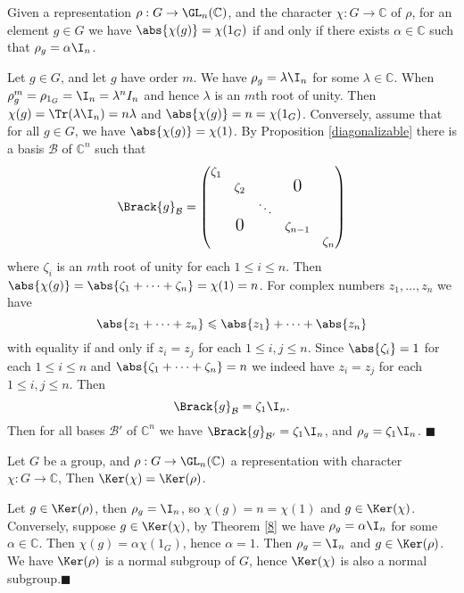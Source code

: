 \documentclass[../Project.tex]{subfiles}
\begin{document}
\begin{theo}[{\cite[13.11(1)]{2}}]
	Given a representation $\rho : G \to \GL_n(\mathbb{C})$, and the character $\chi : G \to \mathbb{C}$ of $\rho$, for an element $g \in G$ we have $\abs{\chi(g)} = \chi(1_G)$ if and only if there exists $\alpha \in \mathbb{C}$ such that $\rho_g = \alpha \I_n$.
	\label{8}
\end{theo}
\begin{proo*}[{\cite[13.11(1)]{2}}]
	Let $g \in G$, and let $g$ have order $m$. We have  $\rho_g = \lambda\I_n$ for some $\lambda \in \mathbb{C}$. When $\rho_g^m = \rho_{1_G} = \I_n = \lambda^nI_n$ and hence $\lambda$ is an $m$th root of unity. Then $\chi(g) = \Tr(\lambda\I_n) = n\lambda$ and $\abs{\chi(g)} = n = \chi(1_G)$. Conversely, assume that for all $g \in G$, we have $\abs{\chi(g)} = \chi(1)$. By Proposition \ref{diagonalizable} there is a basis $\mathcal{B}$ of $\mathbb{C}^n$ such that
	$$\Brack{g}_\mathcal{B} =  \begin{pmatrix}
	\zeta_1 &  & &  & \\
	 & \zeta_2 & & \text{\Large{0}}&  \\
	& & \ddots & & \\
	 & \text{\Large{0}} & & \zeta_{n-1} & \\ 
	&  & & & \zeta_n\end{pmatrix}$$
	where $\zeta_i$ is an $m$th root of unity for each $1 \leqslant i \leqslant n$.
	Then $\abs{\chi(g)} = \abs{\zeta_1 + \cdots + \zeta_n} = \chi(1) = n$. For complex numbers $z_1,\dots,z_n$ we have
	$$\abs{z_1 + \cdots + z_n} \leqslant \abs{z_1} + \cdots + \abs{z_n}$$
	with equality if and only if $z_i = z_j$ for each $1 \leqslant i,j \leqslant n$. Since $\abs{\zeta_i} = 1$ for each $1 \leqslant i \leqslant n$ and $\abs{\zeta_1 + \cdots + \zeta_n} = n$ we indeed have $z_i = z_j$ for each $1 \leqslant i,j \leqslant n$. Then
	$$\Brack{g}_\mathcal{B} = \zeta_1\I_n.$$
	Then for all bases $\mathcal{B}'$ of $\mathbb{C}^n$ we have $\Brack{g}_{\mathcal{B}'} = \zeta_1\I_n$, and $\rho_g = \zeta_1\I_n$. \hfill$\blacksquare$\\
\end{proo*}

\begin{theo}[{\cite[13.11(2)]{2}}]
\label{mehker}
	Let $G$ be a group, and $\rho : G \to \GL_n(\mathbb{C})$ a representation with character $\chi : G \to \mathbb{C}$, Then $\Ker(\chi) = \Ker(\rho)$.
\end{theo}

\begin{proo*}[{\cite[13.11(2)]{2}}]
	Let $g \in \Ker(\rho)$, then $\rho_g = \I_n$, so $\chi(g) = n = \chi(1)$ and $g \in \Ker(\chi)$. Conversely, suppose $g \in \Ker(\chi)$, by Theorem \ref{8} we have $\rho_g = \alpha \I_n$ for some $\alpha \in \mathbb{C}$. Then $\chi(g) = \alpha \chi(1_G)$, hence $\alpha = 1$. Then $\rho_g = \I_n$ and $g \in \Ker(\rho)$.\\
	We have $\Ker(\rho)$ is a normal subgroup of $G$, hence $\Ker(\chi)$ is also a normal subgroup.\hfill$\blacksquare$\\
\end{proo*}
\end{document}
